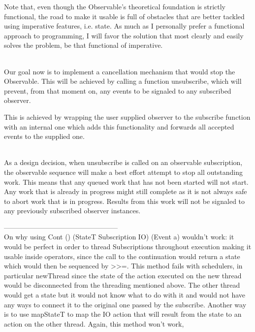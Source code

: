 Note that, even though the Observable's theoretical foundation is strictly functional, the road to make it usable is full of obstacles that are better tackled using imperative features, i.e. state. As much as I personally prefer a functional approach to programming, I will favor the solution that most clearly and easily solves the problem, be that functional of imperative.

\\

Our goal now is to implement a cancellation mechanism that would stop the Observable. This will be achieved by calling a function unsubscribe, which will prevent, from that moment on, any events to be signaled to any subscribed observer.

This is achieved by wrapping the user supplied observer to the subscribe function with an internal one which adds this functionality and forwards all accepted events to the supplied one.

\\

As a design decision, when unsubscribe is called on an observable subscription, the observable sequence will make a best effort attempt to stop all outstanding work. This means that any queued work that has not been started will not start. Any work that is already in progress might still complete as it is not always safe to abort work that is in progress. Results from this work will not be signaled to any previously subscribed observer instances.



--------------------------------------------------\\
On why using Cont () (StateT Subscription IO) (Event a) wouldn't work: it would be perfect in order to thread Subscriptions throughout execution making it usable inside operators, since the call to the continuation would return a state which would then be sequenced by >>=. This method fails with schedulers, in particular newThread since the state of the action executed on the new thread would be disconnected from the threading mentioned above. The other thread would get a state but it would not know what to do with it and would not have any ways to connect it to the original one passed by the subscribe. Another way is to use mapStateT to map the IO action that will result from the state to an action on the other thread. Again, this method won't work, 

